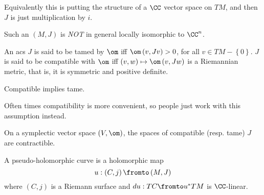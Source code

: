 \documentclass{amsart}
\begin{document}
Equivalently this is putting the structure of a $\CC$ vector space 
on $TM$, and then $J$ is just multiplication by $i$.

\begin{wrn}
Such an $\left( M , J \right)$ is \emph{NOT} in general locally
isomorphic to $\CC^n$.
\end{wrn}

An acs $J$ is said to be tamed by $\om$ iff
$\om\left( v , J v \right) > 0$, for all
$v\in TM \minus\left\{ 0 \right\}$.
$J$ is said to be compatible with $\om$ iff
$\left( v , w \right)\mapsto \om\left( v , Jw \right)$ is a Riemannian metric, 
that is, it is symmetric and positive definite.

\begin{lem}
Compatible implies tame.
\end{lem}

Often times compatibility is more convenient, so people just work with this 
assumption instead.

\begin{lem}
On a symplectic vector space $\left( V , \om \right)$, 
the spaces of compatible (resp. tame) $J$
are contractible.
\end{lem}

A pseudo-holomorphic curve is a holomorphic map 
\begin{equation}
u:\left( C , j \right) \fromto \left( M , J \right)
\end{equation}
where $\left( C ,j \right)$ is a Riemann surface and $du:TC\fromto u^*TM$
is $\CC$-linear.
\end{document}
